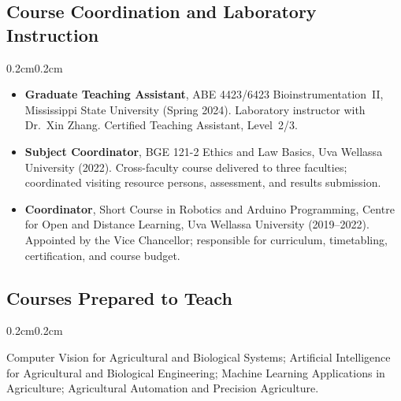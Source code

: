 \documentclass[10pt, letterpaper]{article}
\newenvironment{highlights}{%
    \begin{itemize}[topsep=0.08cm, parsep=0.08cm, partopsep=0pt,
                    itemsep=0pt, leftmargin=0.4cm + 10pt]
}{\end{itemize}}
\newenvironment{onecolentry}{%
    \begin{adjustwidth}{0.2cm}{0.2cm}
}{\end{adjustwidth}}
\begin{document}
\subsection{Course Coordination and Laboratory Instruction}
\begin{onecolentry}
    \begin{highlights}
        \item \textbf{Graduate Teaching Assistant}, ABE 4423/6423 Bioinstrumentation~II,
              Mississippi State University (Spring 2024). Laboratory instructor with
              Dr.\ Xin Zhang. Certified Teaching Assistant, Level~2/3.
        \item \textbf{Subject Coordinator}, BGE 121-2 Ethics and Law Basics,
              Uva Wellassa University (2022). Cross-faculty course delivered to three
              faculties; coordinated visiting resource persons, assessment, and
              results submission.
        \item \textbf{Coordinator}, Short Course in Robotics and Arduino Programming,
              Centre for Open and Distance Learning, Uva Wellassa University
              (2019--2022). Appointed by the Vice Chancellor; responsible for
              curriculum, timetabling, certification, and course budget.
    \end{highlights}
\end{onecolentry}
\vspace{0.14cm}

\subsection{Courses Prepared to Teach}
\begin{onecolentry}
    Computer Vision for Agricultural and Biological Systems; Artificial Intelligence
    for Agricultural and Biological Engineering; Machine Learning Applications in
    Agriculture; Agricultural Automation and Precision Agriculture.
\end{onecolentry}
\vspace{0.18cm}

\end{document}
